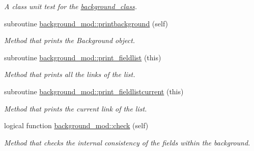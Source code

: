 \begin{DoxyCompactItemize}
\begin{DoxyCompactList}\small\item\em A class \textquotesingle{}unit\textquotesingle{} test for the \mbox{\hyperlink{structbackground__mod_1_1background__class}{background\+\_\+class}}. \end{DoxyCompactList}\item 
subroutine \mbox{\hyperlink{namespacebackground__mod_a8a8f225cffcddb742f22a402155b703f}{background\+\_\+mod\+::printbackground}} (self)
\begin{DoxyCompactList}\small\item\em Method that prints the Background object. \end{DoxyCompactList}\item 
subroutine \mbox{\hyperlink{namespacebackground__mod_acdcc52b4fb298bc145a121f9e8a4b929}{background\+\_\+mod\+::print\+\_\+fieldlist}} (this)
\begin{DoxyCompactList}\small\item\em Method that prints all the links of the list. \end{DoxyCompactList}\item 
subroutine \mbox{\hyperlink{namespacebackground__mod_a2bd18f3830c0667741efd086d36753db}{background\+\_\+mod\+::print\+\_\+fieldlistcurrent}} (this)
\begin{DoxyCompactList}\small\item\em Method that prints the current link of the list. \end{DoxyCompactList}\item 
logical function \mbox{\hyperlink{namespacebackground__mod_af2f517e4aa946491744e012153045bd4}{background\+\_\+mod\+::check}} (self)
\begin{DoxyCompactList}\small\item\em Method that checks the internal consistency of the fields within the background. \end{DoxyCompactList}\end{DoxyCompactItemize}
